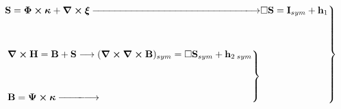 \documentclass[10pt,a4paper]{article}
\theoremstyle{plain}
\newenvironment{rcases}
  {\left.\begin{aligned}}
  {\end{aligned}\right\rbrace}
\begin{document}
\begin{figure}[h!]

\begin{equation*}
\begin{rcases}
  \mathbf{S}=\mathbf\Phi\bm\times\bm\kappa +
  \bm\nabla\bm\times\bm\xi
  -\hspace{-1.5mm}-\hspace{-1.5mm}-\hspace{-1.5mm}-\hspace{-1.5mm}-
\hspace{-1.5mm}-\hspace{-1.5mm}-\hspace{-1.5mm}-\hspace{-1.5mm}-
\hspace{-1.5mm}-\hspace{-1.5mm}-\hspace{-1.5mm}-\hspace{-1.5mm}-
\hspace{-1.5mm}-\hspace{-1.5mm}-\hspace{-1.5mm}-\hspace{-1.5mm}-
\hspace{-1.5mm}-\hspace{-1.5mm}-\hspace{-1.5mm}-\hspace{-1.5mm}-
\hspace{-1.5mm}-\hspace{-1.5mm}-\hspace{-1.5mm}-\hspace{-1.5mm}-
\hspace{-1.5mm}-\hspace{-1.5mm}-\hspace{-1.5mm}-\hspace{-2mm}
  \longrightarrow & \square \mathbf{S}= \mathbf{I}_{sym} +
  \mathbf{h}_{1} \\ \\ \\
\begin{rcases}
   &\bm\nabla\bm\times \mathbf{H}= \mathbf{B}+ \mathbf{S}
  \longrightarrow
  (\bm\nabla\bm\times\bm\nabla\bm\times\mathbf{B})_{sym} =\square
  \mathbf{S}_{sym} + \mathbf{h}_{2\;sym} \\ \\ \\ &\mathbf{B}=\bm\Psi
  \bm\times \bm\kappa
  -\hspace{-1.5mm}-\hspace{-1.5mm}-\hspace{-1.5mm}-\hspace{-1.5mm}-\hspace{-1.5mm}\longrightarrow

\end{rcases}
\end{rcases}
\end{equation*}
\end{figure}
\end{document}

